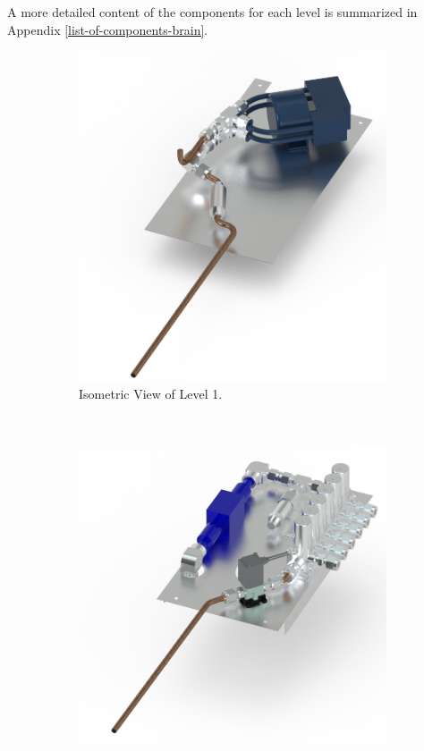 \documentclass[a4paper,12pt,oneside]{article}
\begin{document}
A more detailed content of the components for each level is summarized in Appendix \ref{list-of-components-brain}.
\begin{figure}[H]
    \centering
    \begin{subfigure}[b]{0.3\textwidth}
    \centering
    \includegraphics[width=\textwidth]{4-experiment-design/img/Mechanical/Figure_24a.png}
    \caption{Isometric View of Level 1.}
    \label{level_1}
    \end{subfigure}
    ~
    \begin{subfigure}[b]{0.3\textwidth}
    \centering
    \includegraphics[width=\textwidth]{4-experiment-design/img/Mechanical/Figure_24b.png}

\end{subfigure}
\end{figure}
\end{document}
